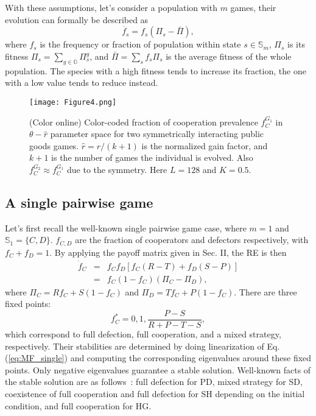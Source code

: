 \documentclass[showpacs,superscriptaddress,reprint,nofootinbib,amsmath,amssymb,aps,pre]{revtex4-1}
\begin{document}
With these assumptions, let's consider a population with $m$ games, their evolution can formally be described as 
\begin{equation}
\dot{{f}_{s}}=f_{s}(\Pi_{s}-\bar{\Pi}),\label{eq:MF}
\end{equation}
where $f_{s}$ is the frequency or fraction of population within state $s\in\mathbb{S}_m$, $\Pi_{s}$ is its fitness $\Pi_{s}=\sum_{g\in\mathbb{G}}\Pi^{g}_s$, and $\bar{\Pi}=\sum_{s}f_{s}\Pi_{s}$ is the average fitness of the whole population. The species with a high fitness tends to increase its fraction, the one with a low value tends to reduce instead.

\begin{figure}[htbp]
\centering
\texttt{[image: Figure4.png]}
\caption{(Color online)
Color-coded fraction of cooperation prevalence $f^{G_1}_C$ in $\theta-\hat{r}$ parameter space for two symmetrically interacting public goods games. $\hat{r}=r/(k+1)$ is the normalized gain factor, and $k+1$ is the number of games the individual is evolved.
Also $f^{G_2}_C\approx f^{G_1}_C$ due to the symmetry. Here $L=128$ and $K=0.5$.
}
\label{fig:PGG}
\end{figure}

\subsection{A single pairwise game}\label{subsec:mf_single}
Let's first recall the well-known single pairwise game case, where $m\!=\!1$ and $\mathbb{S}_1\!=\!\{C,D\}$. $f_{C,D}$ are the fraction of cooperators
and defectors respectively, with $f_{C}+f_{D}=1$. By applying the payoff matrix given in Sec. II, 
the RE is then 
\begin{eqnarray}
\dot{{f}}_{C}& = & f_Cf_D[f_C(R-T)+f_D(S-P)] \nonumber \\
                   & = & f_{C}(1-f_{C})(\Pi_C-\Pi_D),\label{eq:MF_single}
\end{eqnarray}
where $\Pi_C=R f_C+S(1-f_C)$ and $\Pi_D=T f_C+P(1-f_C)$. There are three fixed points:
\begin{equation}
f_{C}^{*}=0,1,\frac{{P-S}}{R+P-T-S},\label{eq:MF_solution}
\end{equation}
which correspond to full defection, full cooperation, and a mixed strategy, respectively.
Their stabilities are determined by doing linearization of Eq. (\ref{eq:MF_single}) and computing the corresponding eigenvalues around these fixed points. Only negative eigenvalues guarantee a stable solution. Well-known facts of the stable solution are as follows~\cite{smith1982evolution}: full defection for PD, mixed strategy for SD, coexistence of full cooperation and full defection for SH depending on the initial condition, and full cooperation for HG. 
\end{document}
